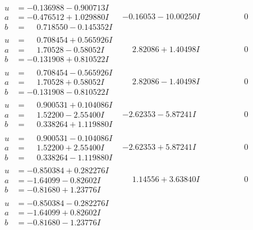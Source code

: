 \documentclass[1p]{elsarticle_modified}
\theoremstyle{definition}
\begin{document}
$$\begin{array}{c|c|c}
\begin{aligned}
u &= -0.136988 - 0.900713 I \\
a &= -0.476512 + 1.029880 I \\
b &= \phantom{-}0.718550 - 0.145352 I\end{aligned}
 & -0.16053 - 10.00250 I & \phantom{-0.000000 } 0 \\ \hline\begin{aligned}
u &= \phantom{-}0.708454 + 0.565926 I \\
a &= \phantom{-}1.70528 - 0.58052 I \\
b &= -0.131908 + 0.810522 I\end{aligned}
 & \phantom{-}2.82086 + 1.40498 I & \phantom{-0.000000 } 0 \\ \hline\begin{aligned}
u &= \phantom{-}0.708454 - 0.565926 I \\
a &= \phantom{-}1.70528 + 0.58052 I \\
b &= -0.131908 - 0.810522 I\end{aligned}
 & \phantom{-}2.82086 - 1.40498 I & \phantom{-0.000000 } 0 \\ \hline\begin{aligned}
u &= \phantom{-}0.900531 + 0.104086 I \\
a &= \phantom{-}1.52200 - 2.55400 I \\
b &= \phantom{-}0.338264 + 1.119880 I\end{aligned}
 & -2.62353 - 5.87241 I & \phantom{-0.000000 } 0 \\ \hline\begin{aligned}
u &= \phantom{-}0.900531 - 0.104086 I \\
a &= \phantom{-}1.52200 + 2.55400 I \\
b &= \phantom{-}0.338264 - 1.119880 I\end{aligned}
 & -2.62353 + 5.87241 I & \phantom{-0.000000 } 0 \\ \hline\begin{aligned}
u &= -0.850384 + 0.282276 I \\
a &= -1.64099 - 0.82602 I \\
b &= -0.81680 + 1.23776 I\end{aligned}
 & \phantom{-}1.14556 + 3.63840 I & \phantom{-0.000000 } 0 \\ \hline\begin{aligned}
u &= -0.850384 - 0.282276 I \\
a &= -1.64099 + 0.82602 I \\
b &= -0.81680 - 1.23776 I\end{aligned}

\end{array}$$
\end{document}
